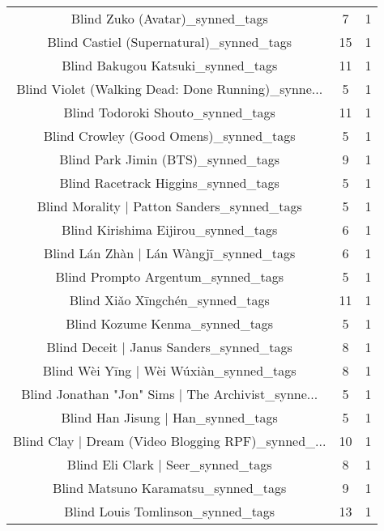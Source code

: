\begin{table}[h!]
{\begin{tabular}{|c|c|c|}
                   Blind Zuko (Avatar)\_synned\_tags &           7 &          1 \\
          Blind Castiel (Supernatural)\_synned\_tags &          15 &          1 \\
                 Blind Bakugou Katsuki\_synned\_tags &          11 &          1 \\
Blind Violet (Walking Dead: Done Running)\_synne... &           5 &          1 \\
                 Blind Todoroki Shouto\_synned\_tags &          11 &          1 \\
            Blind Crowley (Good Omens)\_synned\_tags &           5 &          1 \\
                Blind Park Jimin (BTS)\_synned\_tags &           9 &          1 \\
               Blind Racetrack Higgins\_synned\_tags &           5 &          1 \\
       Blind Morality | Patton Sanders\_synned\_tags &           5 &          1 \\
               Blind Kirishima Eijirou\_synned\_tags &           6 &          1 \\
           Blind Lán Zhàn | Lán Wàngjī\_synned\_tags &           6 &          1 \\
                Blind Prompto Argentum\_synned\_tags &           5 &          1 \\
                   Blind Xiǎo Xīngchén\_synned\_tags &          11 &          1 \\
                    Blind Kozume Kenma\_synned\_tags &           5 &          1 \\
          Blind Deceit | Janus Sanders\_synned\_tags &           8 &          1 \\
           Blind Wèi Yīng | Wèi Wúxiàn\_synned\_tags &           8 &          1 \\
Blind Jonathan "Jon" Sims | The Archivist\_synne... &           5 &          1 \\
                Blind Han Jisung | Han\_synned\_tags &           5 &          1 \\
Blind Clay | Dream (Video Blogging RPF)\_synned\_... &          10 &          1 \\
                Blind Eli Clark | Seer\_synned\_tags &           8 &          1 \\
               Blind Matsuno Karamatsu\_synned\_tags &           9 &          1 \\
                 Blind Louis Tomlinson\_synned\_tags &          13 &          1 \\

\end{tabular}}
\end{table}
